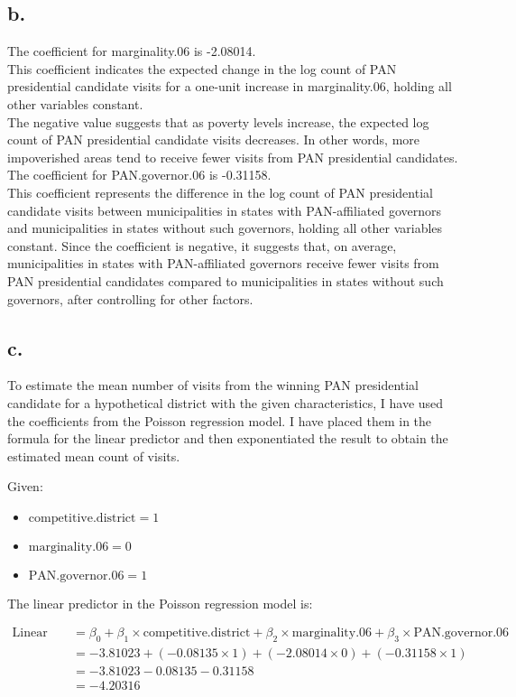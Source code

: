 \documentclass[oneside]{article}
\begin{document}
\subsection*{b.}
The coefficient for marginality.06 is -2.08014.
\\
This coefficient indicates the expected change in the log count of PAN presidential candidate visits for a one-unit increase in marginality.06, holding all other variables constant.
\\
The negative value suggests that as poverty levels increase, the expected log count of PAN presidential candidate visits decreases. In other words, more impoverished areas tend to receive fewer visits from PAN presidential candidates.
\\
The coefficient for PAN.governor.06 is -0.31158.
\\
This coefficient represents the difference in the log count of PAN presidential candidate visits between municipalities in states with PAN-affiliated governors and municipalities in states without such governors, holding all other variables constant.
Since the coefficient is negative, it suggests that, on average, municipalities in states with PAN-affiliated governors receive fewer visits from PAN presidential candidates compared to municipalities in states without such governors, after controlling for other factors.

\subsection*{c.}
To estimate the mean number of visits from the winning PAN presidential candidate for a hypothetical district with the given characteristics, I have used the coefficients from the Poisson regression model. I have placed them in the formula for the linear predictor and then exponentiated the result to obtain the estimated mean count of visits.

Given:
\begin{itemize}
    \item $\text{competitive.district} = 1$
    \item $\text{marginality.06} = 0$
    \item $\text{PAN.governor.06} = 1$
\end{itemize}

The linear predictor in the Poisson regression model is:

\begin{align*}
\text{Linear predictor} & = \beta_0 + \beta_1 \times \text{competitive.district} + \beta_2 \times \text{marginality.06} + \beta_3 \times \text{PAN.governor.06} \\
& = -3.81023 + (-0.08135 \times 1) + (-2.08014 \times 0) + (-0.31158 \times 1) \\
& = -3.81023 - 0.08135 - 0.31158 \\
& = -4.20316
\end{align*}
\end{document}
